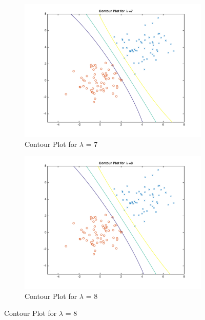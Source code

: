 \documentclass[english]{article}
\begin{document}
\begin{figure}[!htbp]
\begin{subfigure}{0.48\textwidth}
\includegraphics[width=\linewidth]{../plotLambda/plot_7}
\caption{Contour Plot for $\lambda$ = 7} 
\end{subfigure}\hspace*{\fill}
\begin{subfigure}{0.48\textwidth}
\includegraphics[width=\linewidth]{../plotLambda/plot_8}
\caption{Contour Plot for $\lambda$ = 8} \label{fig:b}
\end{subfigure}




\end{figure}
\end{document}
